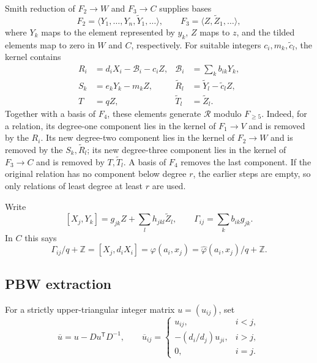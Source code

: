 \documentclass[11pt]{amsart}
\theoremstyle{remark}
\newcommand{\Z}{\mathbb Z}
\begin{document}
Smith reduction of $F_2\to W$ and $F_3\to C$ supplies bases
\[
 F_2=\langle Y_1,\ldots,Y_n,\widetilde Y_1,\ldots\rangle,
 \qquad
 F_3=\langle Z,\widetilde Z_1,\ldots\rangle,
\]
where $Y_k$ maps to the element represented by $y_k$, $Z$ maps to
$z$, and the tilded elements map to zero in $W$ and $C$, respectively.
For suitable integers $c_i,m_k,\widetilde c_l$, the kernel contains
\begin{align}
 R_i&=d_iX_i-\mathcal B_i-c_iZ,
       &\mathcal B_i&=\sum_kb_{ik}Y_k,                    \label{eq:Ri}\\
 S_k&=e_kY_k-m_kZ,
 &\widetilde R_l&=\widetilde Y_l-\widetilde c_lZ,        \label{eq:Sk}\\
 T&=qZ,
 &\widetilde T_l&=\widetilde Z_l.                        \label{eq:Tk}
\end{align}
Together with a basis of $F_4$, these elements generate
$\mathcal R$ modulo $F_{\geq5}$.  Indeed, for a relation, its
degree-one component lies in the kernel of $F_1\to V$ and is removed
by the $R_i$.  Its new degree-two component lies in the kernel of
$F_2\to W$ and is removed by the $S_k,\widetilde R_l$; its new
degree-three component lies in the kernel of $F_3\to C$ and is
removed by $T,\widetilde T_l$.  A basis of $F_4$ removes the last
component.  If the original relation has no component below degree
$r$, the earlier steps are empty, so only relations of least degree at
least $r$ are used.

Write
\begin{equation}\label{eq:Gamma}
 [X_j,Y_k]=g_{jk}Z+\sum_l h_{jkl}\widetilde Z_l,
 \qquad
 \Gamma_{ij}=\sum_kb_{ik}g_{jk}.
\end{equation}
In $C$ this says
\begin{equation}\label{eq:Gamma-phi}
 \Gamma_{ij}/q+\Z=[X_j,d_iX_i]
   =\varphi(a_i,x_j)
   =\widehat\varphi(a_i,x_j)/q+\Z.
\end{equation}

\subsection{PBW extraction}

For a strictly upper-triangular integer matrix $u=(u_{ij})$, set
\begin{equation}\label{eq:ubar}
 \overline u=u-Du^{\mathsf T}D^{-1},\qquad
 \overline u_{ij}=
 \begin{cases}
  u_{ij},&i<j,\\
  -(d_i/d_j)u_{ji},&i>j,\\
  0,&i=j.
 \end{cases}
\end{equation}
\end{document}
